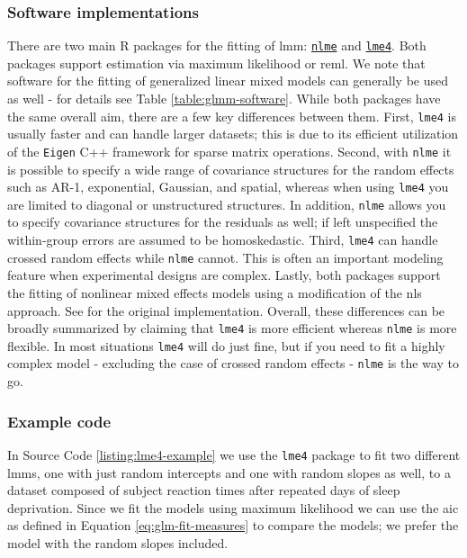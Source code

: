 \documentclass{report}
\begin{document}
\subsubsection{Software implementations}

There are two main R packages for the fitting of \gls{lmm}: \href{https://cran.r-project.org/web/packages/nlme/index.html}{\texttt{nlme}} and \href{https://cran.r-project.org/web/packages/lme4/index.html}{\texttt{lme4}}. Both packages support estimation via maximum likelihood or \gls{reml}. We note that software for the fitting of generalized linear mixed models can generally be used as well - for details see Table \ref{table:glmm-software}. While both packages have the same overall aim, there are a few key differences between them. First, \texttt{lme4} is usually faster and can handle larger datasets; this is due to its efficient utilization of the \texttt{Eigen} C++ framework for sparse matrix operations. Second, with \texttt{nlme} it is possible to specify a wide range of covariance structures for the random effects such as AR-1, exponential, Gaussian, and spatial, whereas when using \texttt{lme4} you are limited to diagonal or unstructured structures. In addition, \texttt{nlme} allows you to specify covariance structures for the residuals as well; if left unspecified the within-group errors are assumed to be homoskedastic. Third, \texttt{lme4} can handle crossed random effects while \texttt{nlme} cannot. This is often an important modeling feature when experimental designs are complex. Lastly, both packages support the fitting of nonlinear mixed effects models using a modification of the \gls{nls} approach. See \cite{lindstrom_nonlinear_1990} for the original implementation. Overall, these differences can be broadly summarized by claiming that \texttt{lme4} is more efficient whereas \texttt{nlme} is more flexible. In most situations \texttt{lme4} will do just fine, but if you need to fit a highly complex model - excluding the case of crossed random effects - \texttt{nlme} is the way to go. 

\subsubsection{Example code}

In Source Code \ref{listing:lme4-example} we use the \texttt{lme4} package to fit two different \glspl{lmm}, one with just random intercepts and one with random slopes as well, to a dataset composed of subject reaction times after repeated days of sleep deprivation. Since we fit the models using maximum likelihood we can use the \gls{aic} as defined in Equation \ref{eq:glm-fit-measures} to compare the models; we prefer the model with the random slopes included. 
\end{document}
